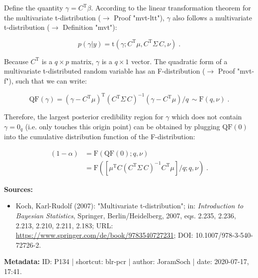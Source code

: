 \documentclass[a4paper,12pt,twoside]{book}
\begin{document}
Define the quantity $\gamma = C^\mathrm{T} \beta$. According to the linear transformation theorem for the multivariate t-distribution ($\rightarrow$ Proof "mvt-ltt"), $\gamma$ also follows a multivariate t-distribution ($\rightarrow$ Definition "mvt"):

\begin{equation} \label{eq:blr-pcr-GLM-NG-post-gamma}
p(\gamma|y) = \mathrm{t}(\gamma; C^\mathrm{T} \mu, C^\mathrm{T} \Sigma \, C, \nu) \; .
\end{equation}

Because $C^\mathrm{T}$ is a $q \times p$ matrix, $\gamma$ is a $q \times 1$ vector. The quadratic form of a multivariate t-distributed random variable has an F-distribution ($\rightarrow$ Proof "mvt-f"), such that we can write:

\begin{equation} \label{eq:blr-pcr-GLM-NG-post-qf}
\mathrm{QF}(\gamma) = (\gamma - C^\mathrm{T} \mu)^\mathrm{T} (C^\mathrm{T} \Sigma \, C)^{-1} (\gamma - C^\mathrm{T} \mu) /q \, \sim \mathrm{F}(q,\nu) \; .
\end{equation}

Therefore, the largest posterior credibility region for $\gamma$ which does not contain $\gamma = 0_q$ (i.e. only touches this origin point) can be obtained by plugging $\mathrm{QF}(0)$ into the cumulative distribution function of the F-distribution:

\begin{equation} \label{eq:blr-pcr-GLM-NG-post-cred-reg-not-H0}
\begin{split}
(1-\alpha) &= \mathrm{F}\left( \mathrm{QF}(0); q, \nu \right) \\
&= \mathrm{F}\left( \left[ \mu^\mathrm{T} C (C^\mathrm{T} \Sigma \, C)^{-1} C^\mathrm{T} \mu \right]/q; q, \nu \right) \; .
\end{split}
\end{equation}


\vspace{1em}
\textbf{Sources:}
\begin{itemize}
\item Koch, Karl-Rudolf (2007): "Multivariate t-distribution"; in: \textit{Introduction to Bayesian Statistics}, Springer, Berlin/Heidelberg, 2007, eqs. 2.235, 2.236, 2.213, 2.210, 2.211, 2.183; URL: \url{https://www.springer.com/de/book/9783540727231}; DOI: 10.1007/978-3-540-72726-2.
\end{itemize}


\vspace{1em}
\textbf{Metadata:} ID: P134 | shortcut: blr-pcr | author: JoramSoch | date: 2020-07-17, 17:41.
\vspace{1em}
\end{document}
